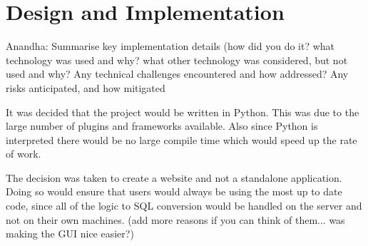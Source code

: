 \documentclass[a4paper, 11pt]{article}
\begin{document}
\section{Design and Implementation}
  Anandha: Summarise key implementation details (how did you do it? what technology was
  used and why? what other technology was considered, but not used and why?
  Any technical challenges encountered and how addressed?  Any risks
  anticipated, and how mitigated

  It was decided that the project would be written in Python. This was due to
  the large number of plugins and frameworks available. Also since Python is
  interpreted there would be no large compile time which would speed up the rate
  of work.

  The decision was taken to create a website and not a standalone application.
  Doing so would ensure that users would always be using the most up to date
  code, since all of the logic to SQL conversion would be handled on the server
  and not on their own machines. (add more reasons if you can think of them...
  was making the GUI nice easier?)


                 
\end{document}
